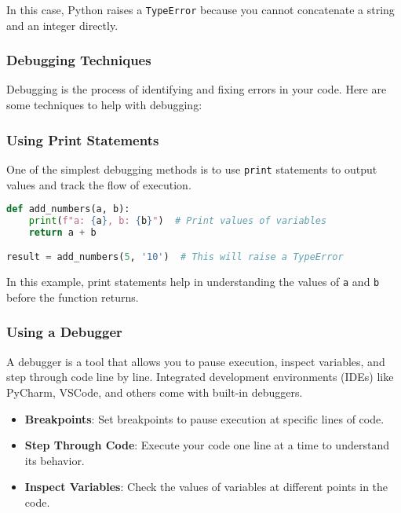 In this case, Python raises a \texttt{TypeError} because you cannot concatenate a string and an integer directly.

\subsubsection{Debugging Techniques}

Debugging is the process of identifying and fixing errors in your code. Here are some techniques to help with debugging:

\subsubsection{Using Print Statements}

One of the simplest debugging methods is to use \texttt{print} statements to output values and track the flow of execution.

\begin{lstlisting}[language=Python, caption=Using \texttt{print} Statements for Debugging]
def add_numbers(a, b):
    print(f"a: {a}, b: {b}")  # Print values of variables
    return a + b

result = add_numbers(5, '10')  # This will raise a TypeError
\end{lstlisting}

In this example, print statements help in understanding the values of \texttt{a} and \texttt{b} before the function returns.

\subsubsection{Using a Debugger}

A debugger is a tool that allows you to pause execution, inspect variables, and step through code line by line. Integrated development environments (IDEs) like PyCharm, VSCode, and others come with built-in debuggers.

\begin{itemize}
    \item \textbf{Breakpoints}: Set breakpoints to pause execution at specific lines of code.
    \item \textbf{Step Through Code}: Execute your code one line at a time to understand its behavior.
    \item \textbf{Inspect Variables}: Check the values of variables at different points in the code.
\end{itemize}

